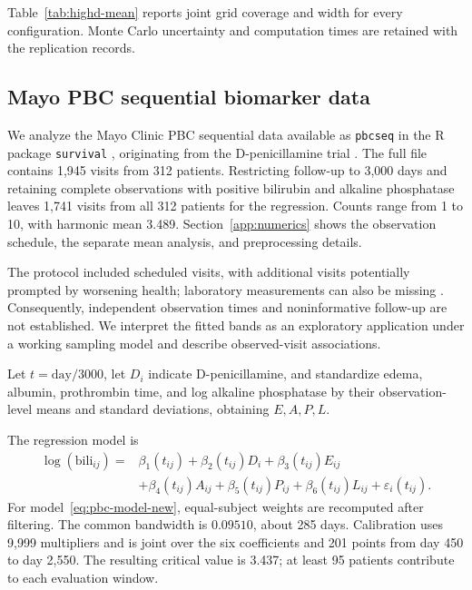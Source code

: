 

Table~\ref{tab:highd-mean} reports joint grid coverage and width for
every configuration. Monte Carlo uncertainty and computation
times are retained with the replication records.


\FloatBarrier
\subsection{Mayo PBC sequential biomarker data}\label{subsec:realdata}

We analyze the Mayo Clinic PBC sequential data available as \texttt{pbcseq} in the R package \texttt{survival} \citep{survival_pbcseq}, originating from the D-penicillamine trial \citep{Dickson1985}. The full file contains 1,945 visits from 312 patients. Restricting follow-up to 3,000 days and retaining complete observations with positive bilirubin and alkaline phosphatase leaves 1,741 visits from all 312 patients for the regression. Counts range from 1 to 10, with harmonic mean 3.489. Section~\ref{app:numerics} shows the observation schedule, the separate mean analysis, and preprocessing details.

The protocol included scheduled visits, with additional visits potentially prompted by worsening health; laboratory measurements can also be missing \citep{survival_pbcseq}. Consequently, independent observation times and noninformative follow-up are not established. We interpret the fitted bands as an exploratory application under a working sampling model and describe observed-visit associations.

Let $t=\mathrm{day}/3000$, let $D_i$ indicate D-penicillamine, and standardize edema, albumin, prothrombin time, and log alkaline phosphatase by their observation-level means and standard deviations, obtaining $E,A,P,L$.

The regression model is
\begin{equation}
\begin{split}
\log(\mathrm{bili}_{ij})={}&\beta_1(t_{ij})+\beta_2(t_{ij})D_i
+\beta_3(t_{ij})E_{ij}\\
&+\beta_4(t_{ij})A_{ij}+\beta_5(t_{ij})P_{ij}
+\beta_6(t_{ij})L_{ij}+\varepsilon_i(t_{ij}).
\end{split}
\label{eq:pbc-model-new}
\end{equation}
For model~\eqref{eq:pbc-model-new}, equal-subject weights are recomputed after filtering. The common bandwidth is $0.09510$, about 285 days. Calibration uses 9,999 multipliers and is joint over the six coefficients and 201 points from day 450 to day 2,550. The resulting critical value is 3.437; at least 95 patients contribute to each evaluation window.

